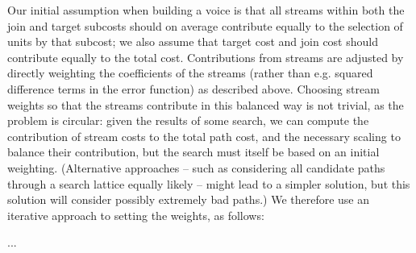 Our initial assumption when building a voice is that all streams within both the join and target subcosts
should on average contribute equally to the selection of units by that subcost; we also assume that 
target cost and join cost should contribute equally to the total cost. 
Contributions from streams are adjusted by directly weighting the coefficients of the streams (rather than
e.g. squared difference terms in the error function) as described above.
Choosing stream weights so that the streams contribute in this balanced way is not trivial, as the problem
is circular: given the results of some search, we can compute the contribution of stream costs to the
total path cost, and the necessary scaling to balance their contribution, but the search must itself be based on an initial weighting. (Alternative approaches -- such as considering all candidate paths through a search lattice equally likely -- might lead to a simpler solution, but this solution will consider possibly extremely bad paths.) We therefore use an iterative approach to setting the weights, as follows:

...



